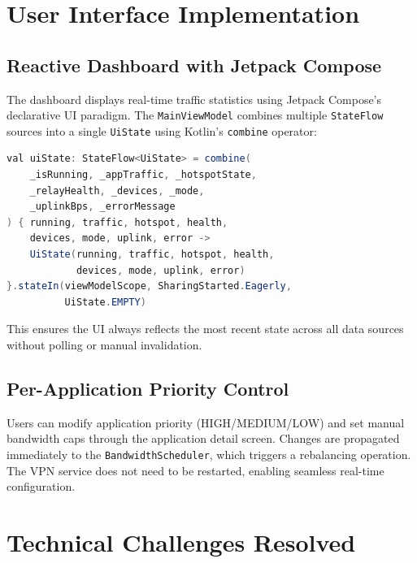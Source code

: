 
\section{User Interface Implementation}
\label{sec:ui_impl}

\subsection{Reactive Dashboard with Jetpack Compose}

The dashboard displays real-time traffic statistics using Jetpack Compose's declarative UI paradigm. The \texttt{MainViewModel} combines multiple \texttt{StateFlow} sources into a single \texttt{UiState} using Kotlin's \texttt{combine} operator:

\begin{lstlisting}[language=Java, caption={Combining multiple state flows for the UI}]
val uiState: StateFlow<UiState> = combine(
    _isRunning, _appTraffic, _hotspotState,
    _relayHealth, _devices, _mode,
    _uplinkBps, _errorMessage
) { running, traffic, hotspot, health,
    devices, mode, uplink, error ->
    UiState(running, traffic, hotspot, health,
            devices, mode, uplink, error)
}.stateIn(viewModelScope, SharingStarted.Eagerly,
          UiState.EMPTY)
\end{lstlisting}

This ensures the UI always reflects the most recent state across all data sources without polling or manual invalidation.

\subsection{Per-Application Priority Control}

Users can modify application priority (HIGH/MEDIUM/LOW) and set manual bandwidth caps through the application detail screen. Changes are propagated immediately to the \texttt{BandwidthScheduler}, which triggers a rebalancing operation. The VPN service does not need to be restarted, enabling seamless real-time configuration.


\section{Technical Challenges Resolved}
\label{sec:technical_challenges}

